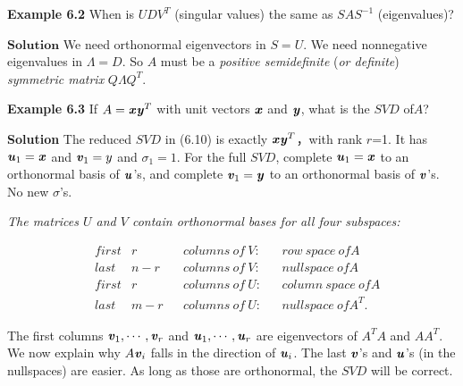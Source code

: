 \begin{flushleft}
	\textbf{Example 6.2} When is $UDV^{T}$ (singular values) the same as $SAS^{-1}$ (eigenvalues)?
\end{flushleft}
\begin{flushleft}
	$ \textbf{Solution} $ We need orthonormal eigenvectors in $S=U$. We need nonnegative eigenvalues in $ \Lambda = D $. So $A$ must be a \textit{positive semidefinite} (\textit{or definite}) \textit{symmetric matrix} $Q \Lambda Q^{T}$.
\end{flushleft}
\begin{flushleft}
	\textbf{Example 6.3} If $A=\textbf{\textit{x}}\textbf{\textit{y}}^{T}$ with unit vectors $\textbf{\textit{x}}$ and $\textbf{\textit{y}}$, what is the $SVD$ of$ A$?
\end{flushleft}
\begin{flushleft}
	\textbf{Solution} The reduced $SVD$ in (6.10) is exactly $\textbf{\textit{x}}\textbf{\textit{y}}^{T}$，with rank $r$=1. It has $\textbf{\textit{u}}_{1}=\textbf{\textit{x}}$ and
	$\textbf{\textit{v}}_{1}=y$ and $\sigma_{1}=1$. For the full $SVD$, complete $\textbf{\textit{u}}_{1}=\textbf{\textit{x}}$ to an orthonormal basis of $\textbf{\textit{u}}$'s,
	and complete $\textbf{\textit{v}}_{1}=\textbf{\textit{y}}$ to an orthonormal basis of $\textbf{\textit{v}}$'s. No new $\sigma$'s.
\end{flushleft}

\textit{The matrices $U$ and $V$ contain orthonormal bases for all four subspaces:}

\begin{align*}
&first  &r&                &columns \ of\ V:&          &row \  space \ of A \\ 
&last  &n-r&              &columns \ of \ V:  &         &nullspace \ of A \\
&first  &r &               &columns \ of\ U: &         &column \ space \ of A \\
&last  &m-r &             &columns \ of \ U: &          &nullspace\ of A^{T}.
\end{align*}

The first columns $\textbf{\textit{v}}_{1},\cdots,\textbf{\textit{v}}_{r}$ and $\textbf{\textit{u}}_{1},\cdots,\textbf{\textit{u}}_{r}$ are eigenvectors of $A^{T}A$ and $AA^{T}$. We now explain why $A\textbf{\textit{v}}_{i}$ falls in the direction of $\textbf{\textit{u}}_{i}$. The last $\textbf{\textit{v}}$'s and $\textbf{\textit{u}}$'s (in the nullspaces) are easier. As long as those are orthonormal, the $SVD$ will be correct.

